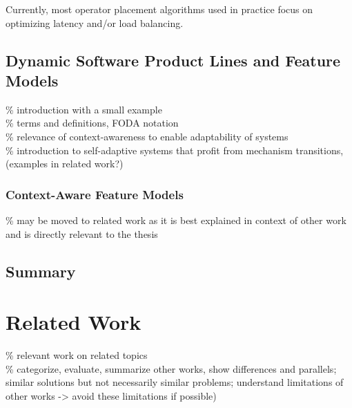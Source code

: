 Currently, most operator placement algorithms used in practice focus on optimizing latency and/or load balancing. 



\section{Dynamic Software Product Lines and Feature Models}
\% introduction with a small example \\
\% terms and definitions, FODA notation \\
\% relevance of context-awareness to enable adaptability of systems \\
\% introduction to self-adaptive systems that profit from mechanism transitions, (examples in related work?)

\subsection{Context-Aware Feature Models} 
\% may be moved to related work as it is best explained in context of other work and is directly relevant to the thesis

\section{Summary}


\chapter{Related Work}
\% relevant work on related topics \\
\% categorize, evaluate, summarize other works, show differences and parallels; similar solutions but not necessarily similar problems; understand limitations of other works -> avoid these limitations if possible)

